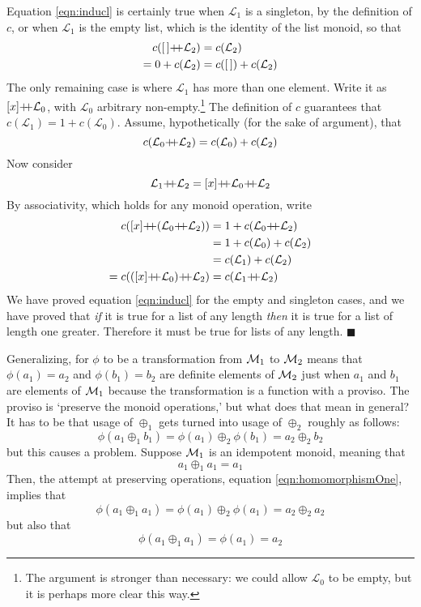 Equation \ref{eqn:inducl} is certainly true when $\mathcal{L}_{1}$ is a singleton, by the definition of $c$, or when $\mathcal{L}_{1}$ is the empty list, which is the identity of the list monoid, so that
\begin{align*}
  c(\emptylist\pp\mathcal{L}_{2})&=c(\mathcal{L}_{2})\\
  =0+c(\mathcal{L}_{2})&=c(\emptylist)+c(\mathcal{L}_{2})
\end{align*}
The only remaining case is where $\mathcal{L}_{1}$ has more than one element. Write it as $[x]\pp\mathcal{L}_{0}$, with $\mathcal{L}_{0}$ arbitrary non-empty.\footnote{The argument is stronger than necessary: we could allow $\mathcal{L}_{0}$ to be empty, but it is perhaps more clear this way.} The definition of $c$ guarantees that $c(\mathcal{L}_{1})=1+c(\mathcal{L}_{0})$. Assume, hypothetically (for the sake of argument), that
$$c(\mathcal{L}_{0}\pp\mathcal{L}_{2})=c(\mathcal{L}_{0})+c(\mathcal{L}_{2})$$
Now consider
$$\mathcal{L}_{1}\pp\mathcal{L}_{2}=[x]\pp\mathcal{L}_{0}\pp\mathcal{L}_{2}$$
By associativity, which holds for any monoid operation, write
\begin{align*}
  c([x]\pp(\mathcal{L}_{0}\pp\mathcal{L}_{2})) &=
  1+c(\mathcal{L}_{0}\pp\mathcal{L}_{2})\\
  &= 1+c(\mathcal{L}_{0})+c(\mathcal{L}_{2})\\
  &= c(\mathcal{L}_{1})+c(\mathcal{L}_{2})  \\
  =c(([x]\pp\mathcal{L}_{0})\pp\mathcal{L}_{2})
  &=c(\mathcal{L}_{1}\pp\mathcal{L}_{2})
\end{align*}
We have proved equation \ref{eqn:inducl} for the empty and singleton cases, and we have proved that \emph{if} it is true for a list of any length \emph{then} it is true for a list of length one greater. Therefore it must be true for lists of any length. $\blacksquare$


Generalizing, for $\phi$ to be a transformation from $\mathcal{M}_{1}$ to $\mathcal{M}_{2}$ means that $\phi(a_1)=a_2$ and $\phi(b_1)=b_2$ are definite elements of $\mathcal{M}_{2}$ just when $a_1$ and $b_1$ are elements of $\mathcal{M}_{1}$ because the transformation is a function with a proviso. The proviso is `preserve the monoid operations,' but what does that mean in general? It has to be that usage of $\oplus_1$ gets turned into usage of $\oplus_2$ roughly as follows:
\begin{equation}
  \phi(a_1 \oplus_1 b_1) = \phi(a_1) \oplus_2 \phi(b_1) = a_2 \oplus_2 b_2
  \label{eqn:homomorphismOne}
\end{equation}
but this causes a problem. Suppose $\mathcal{M}_{1}$ is an idempotent monoid, meaning that
$$a_1 \oplus_1 a_1 = a_1$$
Then, the attempt at preserving operations, equation \ref{eqn:homomorphismOne}, implies that
$$\phi(a_1 \oplus_1 a_1) = \phi(a_1)\oplus_2\phi(a_1)=a_2\oplus_2 a_2$$
but also that
$$\phi(a_1 \oplus_1 a_1) = \phi(a_1)= a_2$$



